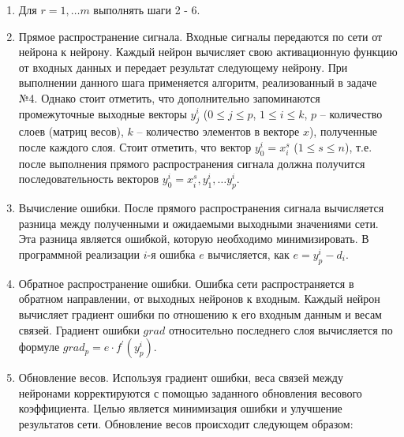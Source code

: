 \documentclass[bachelor, och, otchet]{template}
\begin{document}
        \begin{enumerate}
            \item Для $r = 1, \dots m$ выполнять шаги 2 - 6.
            \item Прямое распространение сигнала. Входные сигналы передаются по сети от 
            нейрона к нейрону. Каждый нейрон вычисляет свою активационную функцию от входных 
            данных и передает результат следующему нейрону. При выполнении данного шага применяется алгоритм,
            реализованный в задаче №4. Однако стоит отметить, что дополнительно запоминаются промежуточные 
            выходные векторы $y_j^i$ ($0 \leq j \leq p$, $1 \leq i \leq k$, $p$ -- количество слоев (матриц весов), $k$ -- количество элементов
            в векторе $x$), полученные после каждого слоя. Стоит отметить, что вектор $y_0^i = x_i^{s}$ ($1 \leq s \leq n$), т.е. после
            выполнения прямого распространения сигнала должна получится последовательность векторов $y_0^i = x_i^{s}, y_1^i, \dots y_p^i$.
            \item Вычисление ошибки. После прямого распространения сигнала 
            вычисляется разница между полученными и ожидаемыми выходными значениями сети. 
            Эта разница является ошибкой, которую необходимо минимизировать. В программной реализации $i$-я
            ошибка $e$ вычисляется, как $e = y_p^i - d_i$.  
            \item Обратное распространение ошибки. Ошибка сети распространяется в обратном направлении, от выходных нейронов к входным. 
            Каждый нейрон вычисляет градиент ошибки по отношению к его входным данным и весам связей. Градиент ошибки $grad$ относительно
            последнего слоя вычисляется по формуле $grad_p = e \cdot f^{'}(y_p^i)$.
            \item Обновление весов. Используя градиент ошибки, веса связей между нейронами корректируются с помощью заданного 
            обновления весового коэффициента. Целью является минимизация ошибки и улучшение результатов сети. Обновление весов происходит 
            следующем образом:


\end{enumerate}
\end{document}
